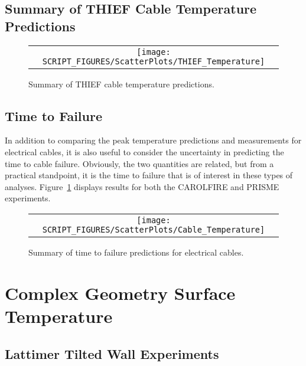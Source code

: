 \subsection{Summary of THIEF Cable Temperature Predictions}


\begin{figure}[h!]
\begin{center}
\begin{tabular}{c}
\texttt{[image: SCRIPT\_FIGURES/ScatterPlots/THIEF\_Temperature]}
\end{tabular}
\end{center}
\caption[Summary of THIEF cable temperature predictions]
{Summary of THIEF cable temperature predictions.}
\end{figure}

\clearpage

\subsection{Time to Failure}

In addition to comparing the peak temperature predictions and measurements for electrical cables, it is also useful to consider the uncertainty in predicting the time to cable failure. Obviously, the two quantities are related, but from a practical standpoint, it is the time to failure that is of interest in these types of analyses. Figure~\ref{Cable_Failure_Time_Summary_Plot} displays results for both the CAROLFIRE and PRISME experiments.

\begin{figure}[h!]
\begin{center}
\begin{tabular}{c}
\texttt{[image: SCRIPT\_FIGURES/ScatterPlots/Cable\_Temperature]}
\end{tabular}
\end{center}
\caption[Summary of time to failure predictions for electrical cables]
{Summary of time to failure predictions for electrical cables.}
\label{Cable_Failure_Time_Summary_Plot}
\end{figure}

\clearpage

\section{Complex Geometry Surface Temperature}


\subsection{Lattimer Tilted Wall Experiments}


